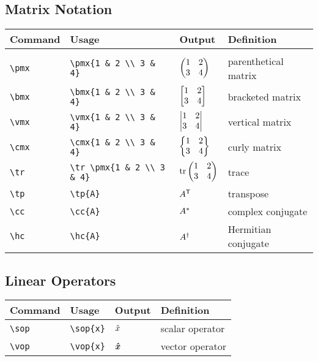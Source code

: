 \documentclass[11pt]{article}
\begin{document}
\subsection{Matrix Notation}

\begin{tabular}{llll}
    Command     & Usage                           & Output                     & Definition           \\
    \hline                                                                                            \\ [-3ex]
    \verb|\pmx| & \verb|\pmx{1 & 2 \\ 3 & 4}|     & $\begin{pmatrix} 1 & 2 \\ 3 & 4 \end{pmatrix}$     & parenthetical matrix \\ [3ex]
    \verb|\bmx| & \verb|\bmx{1 & 2 \\ 3 & 4}|     & $\begin{bmatrix} 1 & 2 \\ 3 & 4 \end{bmatrix}$     & bracketed matrix     \\ [3ex]
    \verb|\vmx| & \verb|\vmx{1 & 2 \\ 3 & 4}|     & $\begin{vmatrix} 1 & 2 \\ 3 & 4 \end{vmatrix}$     & vertical matrix      \\ [3ex]
    \verb|\cmx| & \verb|\cmx{1 & 2 \\ 3 & 4}|     & $\begin{Bmatrix} 1 & 2 \\ 3 & 4 \end{Bmatrix}$     & curly matrix         \\ [3ex]
    \verb|\tr|  & \verb|\tr \pmx{1 & 2 \\ 3 & 4}| & $\operatorname{tr} \begin{pmatrix} 1 & 2 \\ 3 & 4 \end{pmatrix}$ & trace                \\ [3ex]
    \verb|\tp|  & \verb|\tp{A}|                   & $A^\textsf{T}$                   & transpose            \\
    \verb|\cc|  & \verb|\cc{A}|                   & $A^*$                   & complex conjugate    \\
    \verb|\hc|  & \verb|\hc{A}|                   & $A^\dag$                   & Hermitian conjugate  \\
\end{tabular}

\subsection{Linear Operators}

\begin{tabular}{llll}
    Command     & Usage          & Output    & Definition      \\
    \hline
    \verb|\sop| & \verb|\sop{x}| & $\hat{x}$ & scalar operator \\
    \verb|\vop| & \verb|\vop{x}| & $\bm{\hat{x}}$ & vector operator \\
\end{tabular}
\end{document}
